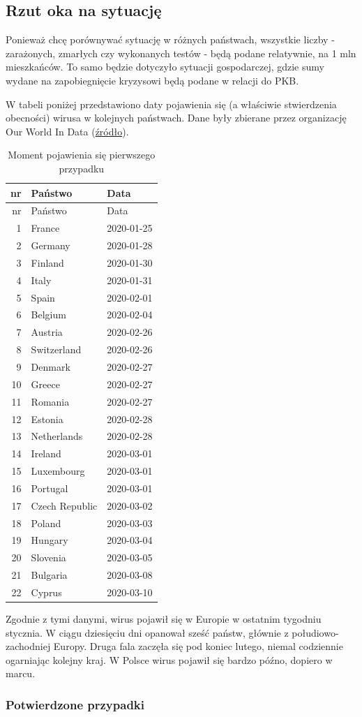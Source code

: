\documentclass[
]{article}
\begin{document}
\hypertarget{rzut-oka-na-sytuacjux119}{%
\subsection{Rzut oka na sytuację}\label{rzut-oka-na-sytuacjux119}}

Ponieważ chcę porównywać sytuację w różnych państwach, wszystkie liczby
- zarażonych, zmarłych czy wykonanych testów - będą podane relatywnie,
na 1 mln mieszkańców. To samo będzie dotyczyło sytuacji gospodarczej,
gdzie sumy wydane na zapobiegnięcie kryzysowi będą podane w relacji do
PKB.

W tabeli poniżej przedstawiono daty pojawienia się (a właściwie
stwierdzenia obecności) wirusa w kolejnych państwach. Dane były zbierane
przez organizację Our World In Data
(\href{https://github.com/owid/covid-19-data}{źródło}).

\begin{longtable}[]{@{}rll@{}}
\caption{Moment pojawienia się pierwszego przypadku}\tabularnewline
\toprule
nr & Państwo & Data\tabularnewline
\midrule
\endfirsthead
\toprule
nr & Państwo & Data\tabularnewline
\midrule
\endhead
1 & France & 2020-01-25\tabularnewline
2 & Germany & 2020-01-28\tabularnewline
3 & Finland & 2020-01-30\tabularnewline
4 & Italy & 2020-01-31\tabularnewline
5 & Spain & 2020-02-01\tabularnewline
6 & Belgium & 2020-02-04\tabularnewline
7 & Austria & 2020-02-26\tabularnewline
8 & Switzerland & 2020-02-26\tabularnewline
9 & Denmark & 2020-02-27\tabularnewline
10 & Greece & 2020-02-27\tabularnewline
11 & Romania & 2020-02-27\tabularnewline
12 & Estonia & 2020-02-28\tabularnewline
13 & Netherlands & 2020-02-28\tabularnewline
14 & Ireland & 2020-03-01\tabularnewline
15 & Luxembourg & 2020-03-01\tabularnewline
16 & Portugal & 2020-03-01\tabularnewline
17 & Czech Republic & 2020-03-02\tabularnewline
18 & Poland & 2020-03-03\tabularnewline
19 & Hungary & 2020-03-04\tabularnewline
20 & Slovenia & 2020-03-05\tabularnewline
21 & Bulgaria & 2020-03-08\tabularnewline
22 & Cyprus & 2020-03-10\tabularnewline
\bottomrule
\end{longtable}

Zgodnie z tymi danymi, wirus pojawił się w Europie w ostatnim tygodniu
stycznia. W ciągu dziesięciu dni opanował sześć państw, głównie z
połudiowo-zachodniej Europy. Druga fala zaczęła się pod koniec lutego,
niemal codziennie ogarniając kolejny kraj. W Polsce wirus pojawił się
bardzo późno, dopiero w marcu.

\hypertarget{potwierdzone-przypadki}{%
\subsubsection{Potwierdzone przypadki}\label{potwierdzone-przypadki}}
\end{document}
